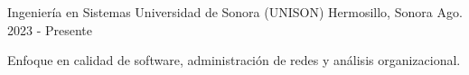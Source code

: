 \begin{cventries}
  \cventry
    {Ingeniería en Sistemas}
    {Universidad de Sonora (UNISON)}
    {Hermosillo, Sonora}
    {Ago. 2023 - Presente}
    {
      \begin{cvitems}
        \item {Enfoque en calidad de software, administración de redes y análisis organizacional.}
      \end{cvitems}
    }
\end{cventries}
